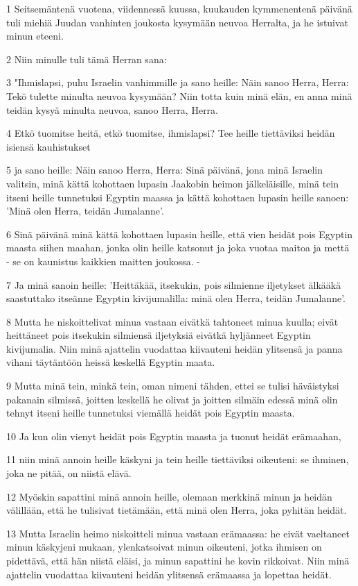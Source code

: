 \par 1 Seitsemäntenä vuotena, viidennessä kuussa, kuukauden kymmenentenä päivänä tuli miehiä Juudan vanhinten joukosta kysymään neuvoa Herralta, ja he istuivat minun eteeni.
\par 2 Niin minulle tuli tämä Herran sana:
\par 3 "Ihmislapsi, puhu Israelin vanhimmille ja sano heille: Näin sanoo Herra, Herra: Tekö tulette minulta neuvoa kysymään? Niin totta kuin minä elän, en anna minä teidän kysyä minulta neuvoa, sanoo Herra, Herra.
\par 4 Etkö tuomitse heitä, etkö tuomitse, ihmislapsi? Tee heille tiettäviksi heidän isiensä kauhistukset
\par 5 ja sano heille: Näin sanoo Herra, Herra: Sinä päivänä, jona minä Israelin valitsin, minä kättä kohottaen lupasin Jaakobin heimon jälkeläisille, minä tein itseni heille tunnetuksi Egyptin maassa ja kättä kohottaen lupasin heille sanoen: 'Minä olen Herra, teidän Jumalanne'.
\par 6 Sinä päivänä minä kättä kohottaen lupasin heille, että vien heidät pois Egyptin maasta siihen maahan, jonka olin heille katsonut ja joka vuotaa maitoa ja mettä - se on kaunistus kaikkien maitten joukossa. -
\par 7 Ja minä sanoin heille: 'Heittäkää, itsekukin, pois silmienne iljetykset älkääkä saastuttako itseänne Egyptin kivijumalilla: minä olen Herra, teidän Jumalanne'.
\par 8 Mutta he niskoittelivat minua vastaan eivätkä tahtoneet minua kuulla; eivät heittäneet pois itsekukin silmiensä iljetyksiä eivätkä hyljänneet Egyptin kivijumalia. Niin minä ajattelin vuodattaa kiivauteni heidän ylitsensä ja panna vihani täytäntöön heissä keskellä Egyptin maata.
\par 9 Mutta minä tein, minkä tein, oman nimeni tähden, ettei se tulisi häväistyksi pakanain silmissä, joitten keskellä he olivat ja joitten silmäin edessä minä olin tehnyt itseni heille tunnetuksi viemällä heidät pois Egyptin maasta.
\par 10 Ja kun olin vienyt heidät pois Egyptin maasta ja tuonut heidät erämaahan,
\par 11 niin minä annoin heille käskyni ja tein heille tiettäviksi oikeuteni: se ihminen, joka ne pitää, on niistä elävä.
\par 12 Myöskin sapattini minä annoin heille, olemaan merkkinä minun ja heidän välillään, että he tulisivat tietämään, että minä olen Herra, joka pyhitän heidät.
\par 13 Mutta Israelin heimo niskoitteli minua vastaan erämaassa: he eivät vaeltaneet minun käskyjeni mukaan, ylenkatsoivat minun oikeuteni, jotka ihmisen on pidettävä, että hän niistä eläisi, ja minun sapattini he kovin rikkoivat. Niin minä ajattelin vuodattaa kiivauteni heidän ylitsensä erämaassa ja lopettaa heidät.
